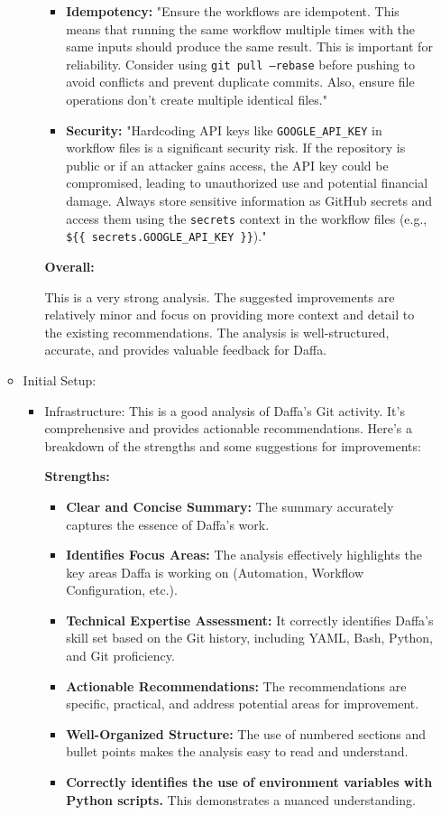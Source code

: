 \documentclass{article}
\begin{document}
\begin{itemize}
\begin{itemize}
\begin{itemize}
\begin{itemize}
    \item \textbf{Idempotency:} "Ensure the workflows are idempotent. This means that running the same workflow multiple times with the same inputs should produce the same result.  This is important for reliability.  Consider using \texttt{git pull --rebase} before pushing to avoid conflicts and prevent duplicate commits. Also, ensure file operations don't create multiple identical files."

    \item \textbf{Security:} "Hardcoding API keys like \texttt{GOOGLE\_API\_KEY} in workflow files is a significant security risk. If the repository is public or if an attacker gains access, the API key could be compromised, leading to unauthorized use and potential financial damage. Always store sensitive information as GitHub secrets and access them using the \texttt{secrets} context in the workflow files (e.g., \texttt{\$\{\{ secrets.GOOGLE\_API\_KEY \}\}})."
\end{itemize}

\textbf{Overall:}

This is a very strong analysis. The suggested improvements are relatively minor and focus on providing more context and detail to the existing recommendations. The analysis is well-structured, accurate, and provides valuable feedback for Daffa.
\end{itemize}

        \item Initial Setup:
        \begin{itemize}
            \item Infrastructure: This is a good analysis of Daffa's Git activity. It's comprehensive and provides actionable recommendations. Here's a breakdown of the strengths and some suggestions for improvements:

\textbf{Strengths:}

\begin{itemize}
    \item \textbf{Clear and Concise Summary:} The summary accurately captures the essence of Daffa's work.
    \item \textbf{Identifies Focus Areas:}  The analysis effectively highlights the key areas Daffa is working on (Automation, Workflow Configuration, etc.).
    \item \textbf{Technical Expertise Assessment:}  It correctly identifies Daffa's skill set based on the Git history, including YAML, Bash, Python, and Git proficiency.
    \item \textbf{Actionable Recommendations:} The recommendations are specific, practical, and address potential areas for improvement.
    \item \textbf{Well-Organized Structure:} The use of numbered sections and bullet points makes the analysis easy to read and understand.
    \item \textbf{Correctly identifies the use of environment variables with Python scripts.} This demonstrates a nuanced understanding.
\end{itemize}


\end{itemize}
\end{itemize}
\end{itemize}
\end{document}
